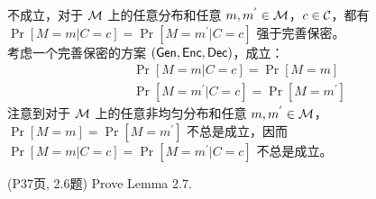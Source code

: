 \begin{questions}
        \begin{solution}
            \newline
            不成立，对于 $\mathcal{M}$ 上的任意分布和任意 $m,m^{'}\in\mathcal{M}$，$c\in\mathcal{C}$，都有 $\Pr[M=m|C=c]=\Pr[M=m^{'}|C=c]$ 强于完善保密。\\
            考虑一个完善保密的方案 $(\mathsf{Gen},\mathsf{Enc},\mathsf{Dec})$，成立：
            \begin{equation}
                \begin{aligned}
                    & \Pr[M=m|C=c]=\Pr[M=m]\\
                    & \Pr[M=m^{'}|C=c]=\Pr[M=m^{'}]
                \end{aligned}
            \end{equation}
            注意到对于 $\mathcal{M}$ 上的任意非均匀分布和任意 $m,m^{'}\in\mathcal{M}$，$\Pr[M=m]=\Pr[M=m^{'}]$ 不总是成立，因而 $\Pr[M=m|C=c]=\Pr[M=m^{'}|C=c]$ 不总是成立。
        \end{solution}

    \question (P37页, 2.6题) Prove Lemma 2.7.


\end{questions}
